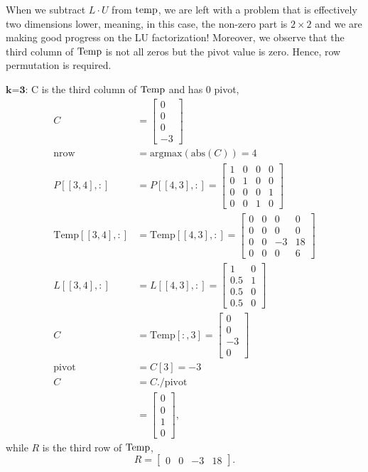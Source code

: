 \begin{tcolorbox}
When we subtract $L \cdot U$ from ${\rm temp}$, we are left with a problem that is effectively two dimensions lower, meaning, in this case, the non-zero part is $2 \times 2$ and we are making good progress on the LU factorization! Moreover, we observe that the third column of ${\rm Temp}$ is not all zeros but the pivot value is zero. Hence, row permutation is required.  
\end{tcolorbox}

$\textbf{k=3:}$ C is the third column of ${\rm Temp}$ and has 0 pivot,
\begin{align*}
    C &=\left[\begin{array}{r} 0 \\ 0 \\ 0 \\ -3 \end{array} \right]\\
    \textrm{nrow} &= \textrm{argmax}\left(\textrm{abs}\left(C\right) \right) = 4 \\
    P[[3, 4], :] &= P[[4, 3], :] = \left[\begin{array}{rrrr} 1 & 0 & 0 & 0\\ 0 & 1 & 0 & 0 \\ 0 & 0 & 0 & 1 \\0 & 0 & 1 & 0 \end{array}\right] \\
    \textrm{Temp}[[3, 4], :] &= \textrm{Temp}[[4, 3], :]= \left[\begin{array}{rrrr} 0 & 0 & 0 & 0\\ 0 & 0 & 0 & 0 \\ 0 & 0 & -3 & 18 \\0 & 0 & 0 & 6 \end{array}\right] \\
    L[[3, 4], :] &= L[[4, 3], :] = \left[ \begin{array}{rr} 1 & 0 \\ 0.5 & 1 \\ 0.5 & 0 \\ 0.5 & 0 \end{array} \right] \\
    C &= \textrm{Temp}[:, 3] = \left[\begin{array}{r} 0 \\ 0 \\ -3 \\ 0 \end{array} \right]\\
    \textrm{pivot}&=C[3] = -3\\
    C &=C. \slash \textrm{pivot} \\
    &= \left[\begin{array}{r} 0 \\ 0 \\1 \\0 \end{array} \right],
\end{align*}
while $R$ is the third row of $\rm Temp$,
$$ R = \left[ \begin{array}{rrrr} 0 & 0 & -3 & 18 \end{array} \right]. $$

